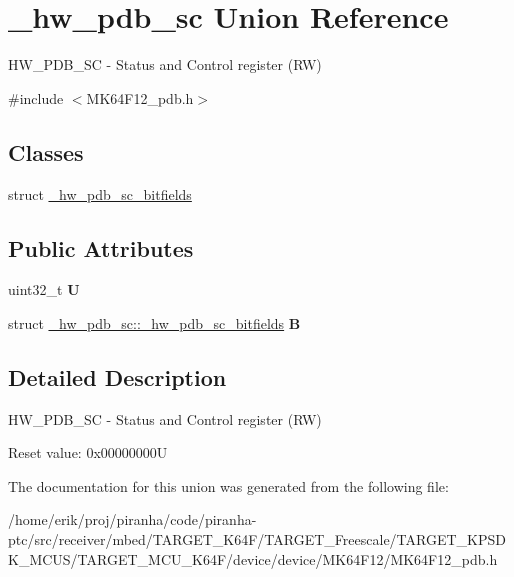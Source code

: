 \hypertarget{union__hw__pdb__sc}{}\section{\+\_\+hw\+\_\+pdb\+\_\+sc Union Reference}
\label{union__hw__pdb__sc}


H\+W\+\_\+\+P\+D\+B\+\_\+\+SC -\/ Status and Control register (RW)  




{\ttfamily \#include $<$M\+K64\+F12\+\_\+pdb.\+h$>$}

\subsection*{Classes}
\begin{DoxyCompactItemize}
\item 
struct \hyperlink{struct__hw__pdb__sc_1_1__hw__pdb__sc__bitfields}{\+\_\+hw\+\_\+pdb\+\_\+sc\+\_\+bitfields}
\end{DoxyCompactItemize}
\subsection*{Public Attributes}
\begin{DoxyCompactItemize}
\item 
uint32\+\_\+t {\bfseries U}\hypertarget{union__hw__pdb__sc_a1bb17d406ddd332e05af8947b24010d2}{}\label{union__hw__pdb__sc_a1bb17d406ddd332e05af8947b24010d2}

\item 
struct \hyperlink{struct__hw__pdb__sc_1_1__hw__pdb__sc__bitfields}{\+\_\+hw\+\_\+pdb\+\_\+sc\+::\+\_\+hw\+\_\+pdb\+\_\+sc\+\_\+bitfields} {\bfseries B}\hypertarget{union__hw__pdb__sc_a7ee8ad47c8a2d5f0c334db62cfb3b8c4}{}\label{union__hw__pdb__sc_a7ee8ad47c8a2d5f0c334db62cfb3b8c4}

\end{DoxyCompactItemize}


\subsection{Detailed Description}
H\+W\+\_\+\+P\+D\+B\+\_\+\+SC -\/ Status and Control register (RW) 

Reset value\+: 0x00000000U 

The documentation for this union was generated from the following file\+:\begin{DoxyCompactItemize}
\item 
/home/erik/proj/piranha/code/piranha-\/ptc/src/receiver/mbed/\+T\+A\+R\+G\+E\+T\+\_\+\+K64\+F/\+T\+A\+R\+G\+E\+T\+\_\+\+Freescale/\+T\+A\+R\+G\+E\+T\+\_\+\+K\+P\+S\+D\+K\+\_\+\+M\+C\+U\+S/\+T\+A\+R\+G\+E\+T\+\_\+\+M\+C\+U\+\_\+\+K64\+F/device/device/\+M\+K64\+F12/M\+K64\+F12\+\_\+pdb.\+h\end{DoxyCompactItemize}
